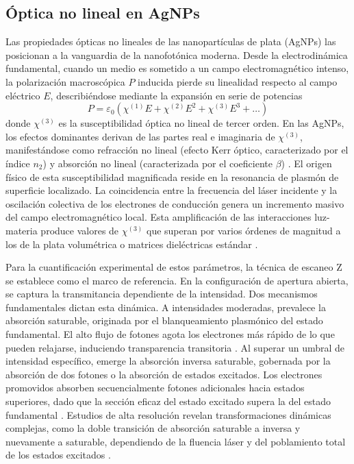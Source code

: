 \subsection{Óptica no lineal en AgNPs}

Las propiedades ópticas no lineales de las nanopartículas de plata (AgNPs) las
posicionan a la vanguardia de la nanofotónica moderna. Desde la electrodinámica
fundamental, cuando un medio es sometido a un campo electromagnético intenso, la
polarización macroscópica $P$ inducida pierde su linealidad respecto al campo
eléctrico $E$, describiéndose mediante la expansión en serie de potencias
$$P=\varepsilon_0(\chi^{(1)}E+\chi^{(2)}E^2+\chi^{(3)}E^3+\dots)$$
donde $\chi^{(3)}$ es la susceptibilidad óptica no lineal de tercer orden. En
las AgNPs, los efectos dominantes derivan de las partes real e imaginaria de
$\chi^{(3)}$, manifestándose como refracción no lineal (efecto Kerr óptico,
caracterizado por el índice $n_2$) y absorción no lineal (caracterizada por el
coeficiente $\beta$) \cite{qayyumNonlinearOpticalProperties2025,
zhouSituFormationSilver2024}.
El origen físico de esta susceptibilidad magnificada reside en la resonancia de
plasmón de superficie localizado. La coincidencia entre la frecuencia del láser
incidente y la oscilación colectiva de los electrones de conducción genera un
incremento masivo del campo electromagnético local. Esta amplificación de las
interacciones luz-materia produce valores de $\chi^{(3)}$ que superan por varios
órdenes de magnitud a los de la plata volumétrica o matrices dieléctricas
estándar \cite{tchindangounouSurfacePlasmonEnhanced2025,
mohamedExcitationWavelengthColloids2022}.

Para la cuantificación experimental de estos parámetros, la técnica de escaneo
Z se establece como el marco de referencia. En la configuración de apertura
abierta, se captura la transmitancia dependiente de la intensidad. Dos
mecanismos fundamentales dictan esta dinámica. A intensidades moderadas,
prevalece la absorción saturable, originada por el blanqueamiento plasmónico
del estado fundamental. El alto flujo de fotones agota los electrones más
rápido de lo que pueden relajarse, induciendo transparencia transitoria
\cite{gonzalez-campuzanoSaturableAbsorptionNegative2023}.
Al superar un umbral de intensidad específico,
emerge la absorción inversa saturable, gobernada por la absorción de dos
fotones o la absorción de estados excitados. Los electrones promovidos
absorben secuencialmente fotones adicionales hacia estados superiores, dado
que la sección eficaz del estado excitado supera la del estado fundamental
\cite{mousaviIntrinsicOpticalBistability2025}.
Estudios de alta resolución revelan transformaciones
dinámicas complejas, como la doble transición de absorción saturable a
inversa y nuevamente a saturable, dependiendo de la fluencia láser y del
poblamiento total de los estados excitados
\cite{jiangDoubleTransformationNonlinear2022, jiangSizeEffectNonlinear2022}.

